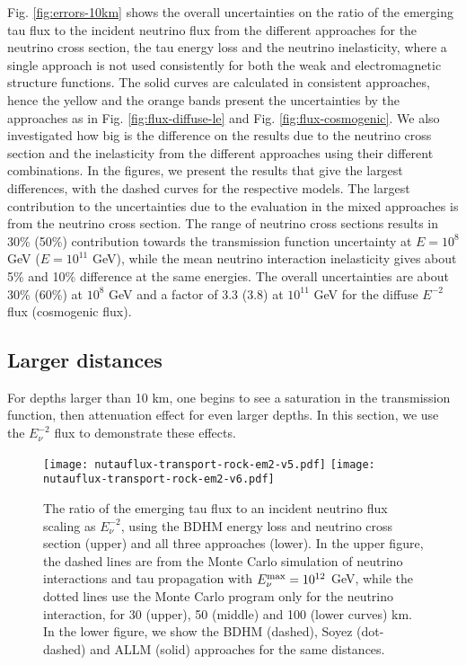 \documentclass[aps,10pt,twocolumn,tightenlines]{revtex4-1}
\begin{document}
Fig. \ref{fig:errors-10km} shows the overall uncertainties on the ratio of the emerging tau flux to the incident neutrino flux
from the different approaches for the neutrino cross section, the tau energy loss and the neutrino inelasticity, where a single
approach is not used consistently for both the weak and electromagnetic structure functions.
The solid curves are calculated in consistent approaches, 
hence the yellow and the orange bands present the uncertainties by the approaches as in Fig. \ref{fig:flux-diffuse-le} and Fig. \ref{fig:flux-cosmogenic}.
We also investigated how big is the difference on the results due to the neutrino cross section and the inelasticity from the different approaches using their different combinations. 
In the figures, we present the results that give the largest differences, with the dashed curves for the respective models.
The largest contribution to the uncertainties due to the evaluation in the mixed approaches is from the neutrino cross section. 
The range of neutrino cross sections results in 30\% (50\%) contribution 
towards the 
transmission function uncertainty at 
$E=10^{8}$ GeV ($E=10^{11}$ GeV), 
while the mean neutrino interaction 
inelasticity gives about 5\% and 10\% difference at the same energies.
The overall uncertainties are about 30\% (60\%) at $10^8$ GeV and 
a factor of 3.3 (3.8) at $10^{11}$ GeV for the diffuse $E^{-2}$ flux (cosmogenic flux). 


\subsection{Larger distances}

For depths larger than 10 km, one begins to see a saturation in the transmission function, then attenuation effect for even larger depths. In this section, we use the $E_\nu^{-2}$ flux to demonstrate these effects.

\begin{figure}[htb]
\centering
	\texttt{[image: nutauflux-transport-rock-em2-v5.pdf]}
	\texttt{[image: nutauflux-transport-rock-em2-v6.pdf]}
	\caption{The ratio of the emerging tau flux to an incident neutrino flux scaling as $E_\nu^{-2}$, using the BDHM energy loss and
	neutrino cross section (upper) and all three approaches (lower). In the upper figure, the dashed lines are from the Monte Carlo simulation of neutrino interactions and tau propagation with
	$E_\nu^{\rm max}=10^{12}$ GeV, while the dotted lines use the Monte Carlo program only for the neutrino interaction,
	for 30 (upper), 50 (middle) and 100 (lower curves) km. In the lower figure, we show the BDHM (dashed), Soyez (dot-dashed)  and ALLM (solid) approaches for the same distances. }
\label{fig:flux-em2-larged}
\end{figure}
\end{document}
